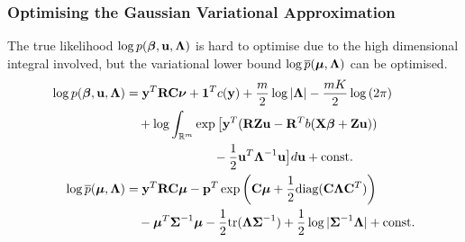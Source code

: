 \documentclass{beamer}
\begin{document}

\begin{frame}
\frametitle{Optimising the Gaussian Variational Approximation}
The true likelihood $\log p({\boldsymbol \beta}, {\bf u}, {\boldsymbol \Lambda})$ is hard to optimise due 
to the high dimensional integral involved, but the variational lower bound $\log \overline{p}({\boldsymbol \mu}, {\boldsymbol \Lambda})$ can be optimised.
\begin{align*}
\log p({\boldsymbol \beta}, {\bf u}, {\boldsymbol \Lambda}) &= {\bf y}^T {\bf R} {\bf C} {\boldsymbol \nu} + {\bf 1}^T c({\bf y}) + \frac{m}{2} \log |{\boldsymbol \Lambda}| - \frac{mK}{2} \log{(2 \pi)}\\
&\quad + \log  \int_{\mathbb{R}^{m}} \exp \big[ {\bf y}^T ({\bf R} {\bf Z} {\bf u} - {\bf R}^T b( {\bf X} {\boldsymbol \beta} + {\bf Z} {\bf u})) \\
 &\quad \quad \quad \quad \quad \quad \quad - {\frac{1}{2}} {{\bf u}^T {\boldsymbol \Lambda}^{-1} {\bf u} } \big] d {\bf u} + \text{const.}\\
\log \overline{p}({\boldsymbol \mu}, {\boldsymbol \Lambda}) &= {\bf y}^T {\bf R} {\bf C} {\boldsymbol \mu} - {\bf p}^T \exp{\left({\bf C}{\boldsymbol\mu}+ {\frac{1}{2}}\text{diag}{({\bf C}{\boldsymbol\Lambda}{\bf C}^T)}\right)} \\
& \quad - {\boldsymbol \mu}^T {\boldsymbol \Sigma}^{-1} {\boldsymbol \mu} - {\frac{1}{2}} \text{tr}{({\boldsymbol\Lambda}{\boldsymbol\Sigma}^{-1})} + {\frac{1}{2}} \log{|{\boldsymbol\Sigma}^{-1}{\boldsymbol\Lambda}|} + \text{const.} \\
\end{align*}
\end{frame}
\end{document}

